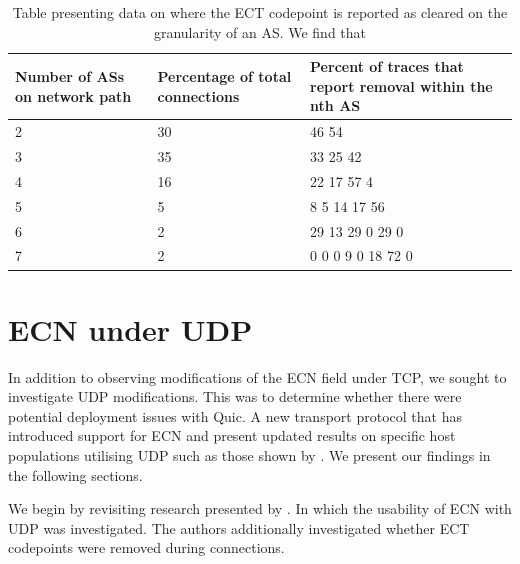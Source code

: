 \documentclass{l4proj}
\begin{document}
\begin{table}[H]
\centering
\begin{tabular}{|p{4cm}|p{4cm}|p{4cm}|}
\hline
Number of ASs on network path & Percentage of total \newline connections & Percent of traces that report  removal within the nth AS \\ \hline
2                             & 30                              & 46 54                                                   \\ \hline
3                             & 35                              & 33 25 42                                                \\ \hline
4                             & 16                              & 22 17 57 4                                             \\ \hline
5                             & 5                               & 8 5 14 17 56                                            \\ \hline
6                             & 2                               & 29 13 29 0 29 0                                         \\ \hline
7                             & 2                               & 0 0 0 9 0 18 72 0                                       \\ \hline
\end{tabular}
\caption{Table presenting data on where the ECT codepoint is reported as cleared on the granularity of an AS. We find that}
\label{tab:asdata}
\end{table}




\section{ECN under UDP}

In addition to observing modifications of the ECN field under TCP, we sought to investigate UDP modifications. This was to determine whether there were potential deployment issues with Quic. A new transport protocol that has introduced support for ECN and present updated results on specific host populations utilising UDP such as those shown by \cite{mcquistin_is_2015}. We present our findings in the following sections.

We begin by revisiting research presented by \cite{mcquistin_is_2015}. In which the usability of ECN with UDP was investigated. The authors additionally investigated whether ECT codepoints were removed during connections.
\end{document}
